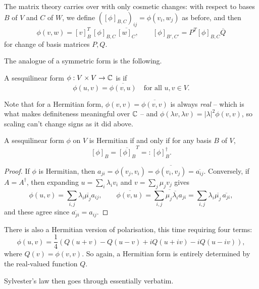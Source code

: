 \documentclass[a4paper]{scrartcl}
\begin{document}
The matrix theory carries over with only cosmetic changes: with respect to bases $B$ of $V$ and $C$ of $W$, we define $([\phi]_{B, C})_{ij} = \phi(v_i, w_j)$ as before, and then
$$
\phi(v, w) = [v]_B^T \, [\phi]_{B,C}\, \overline{[w]_C}, \qquad [\phi]_{B', C'} = P^T [\phi]_{B, C} \overline{Q}
$$
for change of basis matrices $P, Q$.

The analogue of a symmetric form is the following.

\begin{definition}
    A sesquilinear form $\phi: V \times V \rightarrow \mathbb{C}$ is  if
    $$
    \phi(u, v) = \overline{\phi(v, u)} \quad \text{for all } u, v \in V.
    $$
\end{definition}

Note that for a Hermitian form, $\phi(v, v) = \overline{\phi(v,v)}$ is always \emph{real} -- which is what makes definiteness meaningful over $\mathbb{C}$ -- and $\phi(\lambda v, \lambda v) = |\lambda|^2 \phi(v,v)$, so scaling can't change signs as it did above.

\begin{lemma}
    A sesquilinear form $\phi$ on $V$ is Hermitian if and only if for any basis $B$ of $V$,
    $$
    [\phi]_B = \overline{[\phi]_B}^T =: [\phi]_B^\dagger.
    $$
\end{lemma}
\begin{proof}
    If $\phi$ is Hermitian, then $a_{ji} = \phi(v_j, v_i) = \overline{\phi(v_i, v_j)} = \overline{a_{ij}}$. Conversely, if $A = A^\dagger$, then expanding $u = \sum_i \lambda_i v_i$ and $v = \sum_j \mu_j v_j$ gives
    $$
    \phi(u, v) = \sum_{i, j}\lambda_i \overline{\mu_j} a_{ij}, \qquad \overline{\phi(v, u)} = \overline{\sum_{i,j} \mu_j \overline{\lambda_i} a_{ji}} = \sum_{i,j} \lambda_i \overline{\mu_j}\, \overline{a_{ji}},
    $$
    and these agree since $\overline{a_{ji}} = a_{ij}$.
\end{proof}

There is also a Hermitian version of polarisation, this time requiring four terms:
$$
\phi(u, v) = \frac{1}{4}\left(Q(u + v) - Q(u - v) + iQ(u + iv) - iQ(u - iv)\right),
$$
where $Q(v) = \phi(v,v)$. So again, a Hermitian form is entirely determined by the real-valued function $Q$.

Sylvester's law then goes through essentially verbatim.
\end{document}
